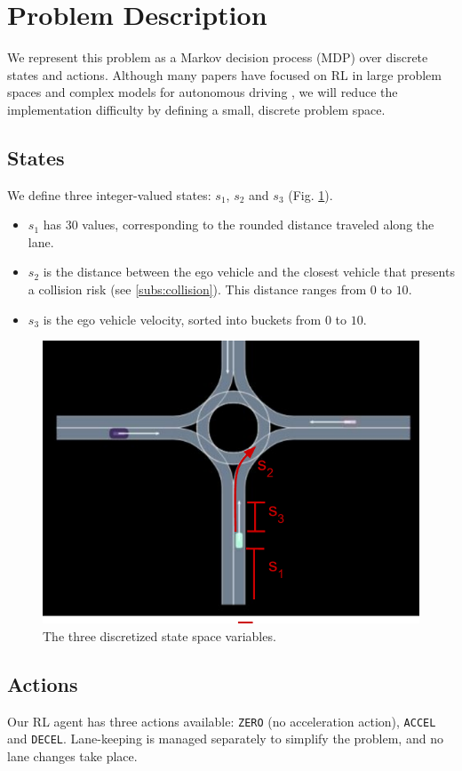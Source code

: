 \documentclass[conference]{IEEEtran}
\begin{document}
\section*{Problem Description}
We represent this problem as a Markov decision process (MDP) over discrete states and actions. Although many papers have focused on RL in large problem spaces and complex models for autonomous driving \cite{kiran2021deep, zhu2020safe}, we will reduce the implementation difficulty by defining a small, discrete problem space.

\subsection{States} We define three integer-valued states: $s_1$, $s_2$ and $s_3$ (Fig. \ref{fig:statespace}).
\begin{itemize}
	\item
$s_1$ has 30 values, corresponding to the rounded distance traveled along the lane.
 \item
$s_2$ is the distance between the ego vehicle and the closest vehicle that presents a collision risk (see \ref{subs:collision}). This distance ranges from $0$ to $10$.
\item
$s_3$ is the ego vehicle velocity, sorted into buckets from $0$ to $10$.
\end{itemize}

\begin{figure}[h!]
	\centering
	\includegraphics[width=0.8\linewidth]{figures/statespace.pdf}
	\caption{The three discretized state space variables.}
	\label{fig:statespace}
\end{figure}

\subsection{Actions} Our RL agent has three actions available: \verb|ZERO| (no acceleration action), \verb|ACCEL| and \verb|DECEL|. Lane-keeping is managed separately to simplify the problem, and no lane changes take place.
\end{document}
